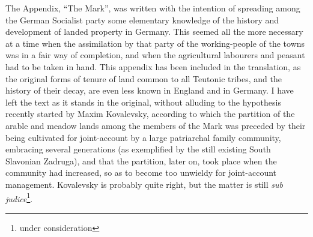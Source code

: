 The Appendix, ``The Mark'', was written with the intention of spreading among
the German Socialist party some elementary knowledge of the history and
development of landed property in Germany. This seemed all the more necessary
at a time when the assimilation by that party of the working-people of the
towns was in a fair way of completion, and when the agricultural labourers and
peasant had to be taken in hand. This appendix has been included in the
translation, as the original forms of tenure of land common to all Teutonic
tribes, and the history of their decay, are even less known in England and in
Germany. I have left the text as it stands in the original, without alluding
to the hypothesis recently started by Maxim Kovalevsky, according to which the
partition of the arable and meadow lands among the members of the Mark was
preceded by their being cultivated for joint-account by a large patriarchal
family community, embracing several generations (as exemplified by the still
existing South Slavonian Zadruga), and that the partition, later on, took
place when the community had increased, so as to become too unwieldy for
joint-account management. Kovalevsky is probably quite right, but the matter is
still \emph{sub judice}\footnote{under consideration}.

